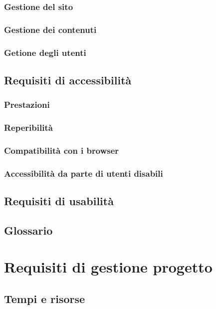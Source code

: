 \documentclass[a4paper,12pt,hidelinks]{report}
\begin{document}
	\subsection{Gestione del sito}
	\subsection{Gestione dei contenuti}
	\subsection{Getione degli utenti}

\section{Requisiti di accessibilità}
	\subsection{Prestazioni}
	\subsection{Reperibilità}
	\subsection{Compatibilità con i browser}
	\subsection{Accessibilità da parte di utenti disabili}

\section{Requisiti di usabilità}

\section{Glossario}


\chapter{Requisiti di gestione progetto}

\section{Tempi e risorse}
\end{document}
